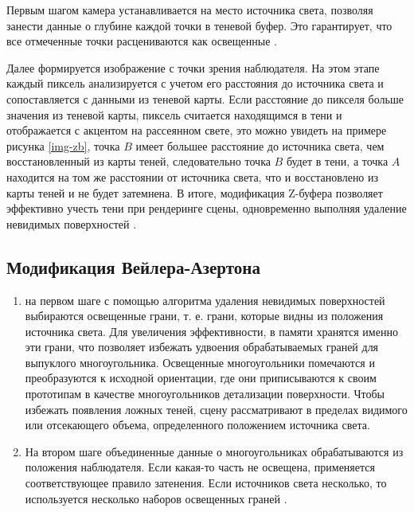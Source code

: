
Первым шагом камера устанавливается на место источника света, позволяя занести данные о глубине каждой точки в теневой буфер. Это гарантирует, что все отмеченные точки расцениваются как освещенные \cite{letion}.

Далее формируется изображение с точки зрения наблюдателя. На этом этапе каждый пиксель анализируется с учетом его расстояния до источника света и сопоставляется с данными из теневой карты. Если расстояние до пикселя больше значения из теневой карты, пиксель считается находящимся в тени и отображается с акцентом на рассеянном свете, это можно увидеть на примере рисунка \ref{img-zb}, точка $ B $ имеет большее расстояние до источника света, чем восстановленный из карты теней, следовательно точка $ B $ будет в тени, а точка $ A $  находится на том же расстоянии от источника света, что и восстановлено из карты теней и не будет затемнена. В итоге, модификация Z-буфера позволяет эффективно учесть тени при рендеринге сцены, одновременно выполняя удаление невидимых поверхностей \cite{letion}.







\subsection{Модификация Вейлера-Азертона}


\begin{enumerate}
\item на первом шаге с помощью алгоритма удаления невидимых поверхностей выбираются освещенные грани, т. е. грани, которые видны из положения источника света. Для увеличения эффективности, в памяти хранятся именно эти грани, что позволяет избежать удвоения обрабатываемых граней для выпуклого многоугольника. Освещенные многоугольники помечаются и преобразуются к исходной ориентации, где они приписываются к своим прототипам в качестве многоугольников детализации поверхности. Чтобы избежать появления ложных теней, сцену рассматривают в пределах видимого или отсекающего объема, определенного положением источника света.
\item На втором шаге объединенные данные о многоугольниках обрабатываются из положения наблюдателя. Если какая-то часть не освещена, применяется соответствующее правило затенения. Если источников света несколько, то используется несколько наборов освещенных граней \cite{letion}.
\end{enumerate}

